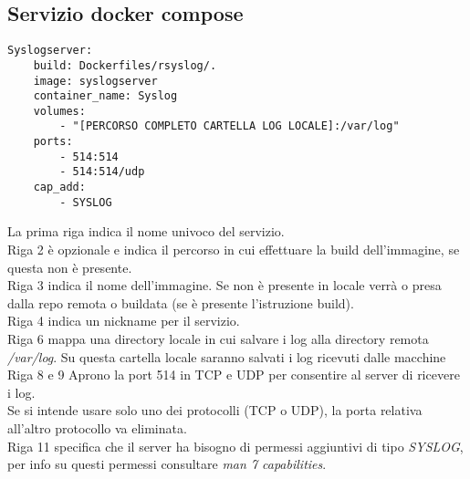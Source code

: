 \documentclass[../DocumentazioneProgetto.tex]{subfiles}
\begin{document}
\subsection{Servizio docker compose} 
\begin{lstlisting}[caption=Rsyslog Docker Compose] 
Syslogserver:
	build: Dockerfiles/rsyslog/.
	image: syslogserver
	container_name: Syslog
	volumes:
		- "[PERCORSO COMPLETO CARTELLA LOG LOCALE]:/var/log"
	ports:
		- 514:514
		- 514:514/udp
	cap_add:
		- SYSLOG\end{lstlisting}
La prima riga indica il nome univoco del servizio.\\
Riga 2 è opzionale e indica il percorso in cui effettuare la build dell'immagine, se questa non è presente.\\
Riga 3 indica il nome dell'immagine. Se non è presente in locale verrà o presa dalla repo remota o buildata (se è presente l'istruzione build).\\
Riga 4 indica un nickname per il servizio.\\
Riga 6 mappa una directory locale in cui salvare i log alla directory remota \textit{/var/log}. Su questa cartella locale saranno salvati i log ricevuti dalle macchine\\
Riga 8 e 9 Aprono la port 514 in TCP e UDP per consentire al server di ricevere i log.\\
Se si intende usare solo uno dei protocolli (TCP o UDP), la porta relativa all'altro protocollo va eliminata.\\
Riga 11 specifica che il server ha bisogno di permessi aggiuntivi di tipo \textit{SYSLOG}, per info su questi permessi consultare \textit{man 7 capabilities}. 
		
\end{document}
